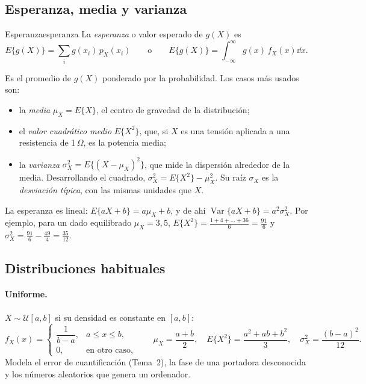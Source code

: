 \documentclass[11pt,a4paper]{scrartcl}
\begin{document}
\subsection{Esperanza, media y varianza}

\begin{definicion}{Esperanza}{esperanza}
  La \emph{esperanza} o valor esperado de $g(X)$ es
  \[
    E\{g(X)\}=\sum_ig(x_i)\,p_X(x_i)\qquad\text{o}\qquad E\{g(X)\}=\int_{-\infty}^{\infty}g(x)\,f_X(x)\dd x .
  \]
\end{definicion}

Es el promedio de $g(X)$ ponderado por la probabilidad. Los casos más usados son:
\begin{itemize}
  \item la \emph{media} $\mu_X=E\{X\}$, el centro de gravedad de la distribución;
  \item el \emph{valor cuadrático medio} $E\{X^2\}$, que, si $X$ es una tensión aplicada a una resistencia de 1\,$\Omega$, es la potencia media;
  \item la \emph{varianza} $\sigma_X^2=E\{(X-\mu_X)^2\}$, que mide la dispersión alrededor de la media. Desarrollando el cuadrado, $\sigma_X^2=E\{X^2\}-\mu_X^2$. Su raíz $\sigma_X$ es la \emph{desviación típica}, con las mismas unidades que $X$.
\end{itemize}
La esperanza es lineal: $E\{aX+b\}=a\mu_X+b$, y de ahí $\operatorname{Var}\{aX+b\}=a^2\sigma_X^2$. Por ejemplo, para un dado equilibrado $\mu_X=3{,}5$, $E\{X^2\}=\frac{1+4+\dots+36}6=\frac{91}6$ y $\sigma_X^2=\frac{91}6-\frac{49}4=\frac{35}{12}$.

\subsection{Distribuciones habituales}

\paragraph{Uniforme.} $X\sim\mathcal U[a,b]$ si su densidad es constante en $[a,b]$:
\[
  f_X(x)=\begin{cases}\dfrac1{b-a},&a\le x\le b,\\0,&\text{en otro caso,}\end{cases}\qquad
  \mu_X=\frac{a+b}2,\quad E\{X^2\}=\frac{a^2+ab+b^2}3,\quad\sigma_X^2=\frac{(b-a)^2}{12}.
\]
Modela el error de cuantificación (Tema~2), la fase de una portadora desconocida y los números aleatorios que genera un ordenador.
\end{document}

